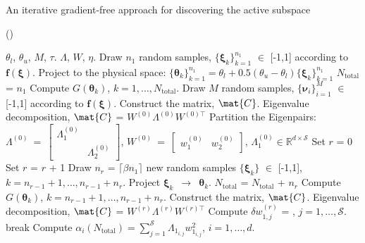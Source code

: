 \bigskip
\begin{breakablealgorithm}
\renewcommand{\algorithmicrequire}{\textbf{Input:}}
\renewcommand{\algorithmicensure}{\textbf{Output:}}
  \caption{An iterative gradient-free approach for discovering the active subspace} ()
  \begin{algorithmic}[1]
\Require $\theta_l$, $\theta_u$, $M$, $\tau$. 
\Ensure $\Lambda$, $W$, $\eta$. 
	\State Draw $n_1$ random samples, $\{\bm{\xi}_k\}_{k=1}^{n_1}$ $\in$ [-1,1]
         according to $\bm{f(\xi)}$.
	\State Project to the physical space:
        $\{\bm{\theta}_k\}_{k=1}^{n_1}=\theta_l+0.5(\theta_u-\theta_l)\{\bm{\xi}_k\}_{k=1}^{n_1}$
	\State $N_\text{total}$ = $n_1$ 
	\State Compute $G(\bm\theta_k)$, $k=1, \ldots, N_\text{total}$.
	\State Draw $M$ random samples, $\{\bm{\nu}_i\}_{i=1}^{M}$ $\in$ [-1,1]
         according to $\bm{f(\xi)}$.
	\State Construct the matrix, $\mat{C}$.
	\State Eigenvalue decomposition, $\mat{C}$ = $W^{(0)}\Lambda^{(0)} W^{(0)\top}$
	\State Partition the Eigenpairs: $\Lambda^{(0)}~=~ 
        \begin{bmatrix} \Lambda_1^{(0)} & \\ & \Lambda_2^{(0)} \end{bmatrix}$, 
        $W^{(0)}~=~\begin{bmatrix} w_1^{(0)} & w_2^{(0)} \end{bmatrix}$, 
        $\Lambda_1^{(0)}\in \mathbb{R}^{d\times\mathcal{S}}$
	\State Set $r$ = 0
	\Loop
		\State Set $r$ = $r$ + 1
		\State Draw $n_r$ = $\lceil \beta n_1 \rceil$ new random samples 
                $\{\bm{\xi}_k\}$ $\in$ [-1,1], $k = n_{r-1}+1,\ldots,n_{r-1}+n_r$.
		\State Project $\bm{\xi}_k$~$\rightarrow$~$\bm{\theta}_k$.
		\State $N_\text{total}$ = $N_\text{total}$ + $n_r$ 
		\State Compute $G(\bm\theta_k)$, $k=n_{r-1}+1, \ldots, n_{r-1}+n_r$.  
		\State Construct the matrix, $\mat{C}$.
		\State Eigenvalue decomposition, $\mat{C}$ = $W^{(r)}\Lambda^{(r)} W^{(r)\top}$
		\State Compute $\delta w_{1,j}^{(r)}$ = 
                       , 
                       $j = 1,\ldots,\mathcal{S}$.
			\State break
		\EndIf
	\EndLoop
	\State Compute $\alpha_i(N_\text{total}) = \sum\limits_{j=1}^{\mathcal{S}} \Lambda_{1_{i,j}}w_{1_{i,j}}^2$,
	$i=1,\ldots,d$.
    \EndProcedure
  \end{algorithmic}
  \label{alg:free1}
\end{breakablealgorithm}
\bigskip

